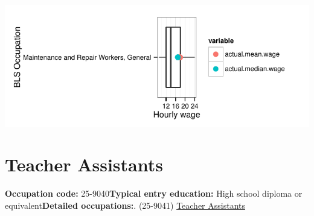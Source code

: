 \documentclass[a4paper,10pt]{article}\usepackage[]{graphicx}\usepackage[]{color}
\makeatletter
\def\maxwidth{ %
  \ifdim\Gin@nat@width>\linewidth
    \linewidth
  \else
    \Gin@nat@width
  \fi
}
\makeatother
\begin{document}
{\centering \includegraphics[width=\maxwidth]{figure/unnamed-chunk-224} 

}


\newpage\section{Teacher Assistants}\textbf{Occupation code:} 25-9040\newline\textbf{Typical entry education:} High school diploma or equivalent\newline\textbf{Detailed occupations:}. (25-9041)  \href{http://www.bls.gov/oes/current/oes259041.htm}{Teacher Assistants}\newline%
\end{document}
